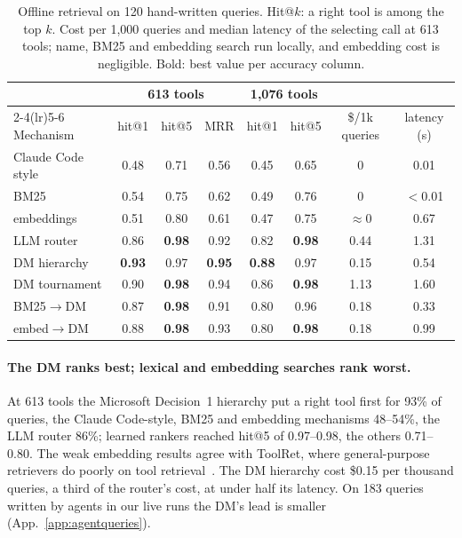 \documentclass[11pt]{article}
\begin{document}
\begin{table}[t]
\centering\small
\caption{Offline retrieval on 120 hand-written queries. Hit@$k$: a right tool is among the top $k$. Cost per
1{,}000 queries and median latency of the selecting call at 613 tools; name, BM25 and embedding search run
locally, and embedding cost is negligible. Bold: best value per accuracy column.}
\label{tab:retrieval}
\setlength{\tabcolsep}{4.5pt}
\begin{tabular}{@{}lccccccc@{}}
\toprule
& \multicolumn{3}{c}{613 tools} & \multicolumn{2}{c}{1{,}076 tools} & & \\
\cmidrule(lr){2-4}\cmidrule(lr){5-6}
Mechanism & hit@1 & hit@5 & MRR & hit@1 & hit@5 & \$/1k queries & latency (s) \\
\midrule
Claude Code style & 0.48 & 0.71 & 0.56 & 0.45 & 0.65 & 0 & 0.01 \\
BM25 & 0.54 & 0.75 & 0.62 & 0.49 & 0.76 & 0 & $<$0.01 \\
embeddings & 0.51 & 0.80 & 0.61 & 0.47 & 0.75 & $\approx$0 & 0.67 \\
LLM router & 0.86 & \textbf{0.98} & 0.92 & 0.82 & \textbf{0.98} & 0.44 & 1.31 \\
\midrule
DM hierarchy & \textbf{0.93} & 0.97 & \textbf{0.95} & \textbf{0.88} & 0.97 & 0.15 & 0.54 \\
DM tournament & 0.90 & \textbf{0.98} & 0.94 & 0.86 & \textbf{0.98} & 1.13 & 1.60 \\
BM25$\to$DM & 0.87 & \textbf{0.98} & 0.91 & 0.80 & 0.96 & 0.18 & 0.33 \\
embed$\to$DM & 0.88 & \textbf{0.98} & 0.93 & 0.80 & \textbf{0.98} & 0.18 & 0.99 \\
\bottomrule
\end{tabular}
\end{table}

\paragraph{The DM ranks best; lexical and embedding searches rank worst.} At 613 tools the Microsoft Decision~1
hierarchy put a right tool first for 93\% of queries, the Claude Code-style, BM25 and embedding mechanisms
48--54\%, the LLM router 86\%; learned rankers reached hit@5 of 0.97--0.98, the others 0.71--0.80. The weak
embedding results agree with ToolRet, where general-purpose retrievers do poorly on tool
retrieval~\citep{shi2025toolret}. The DM hierarchy cost \$0.15 per thousand queries, a third of the router's
cost, at under half its latency. On 183 queries written by agents in our live runs the DM's lead is smaller
(App.~\ref{app:agentqueries}).
\end{document}
